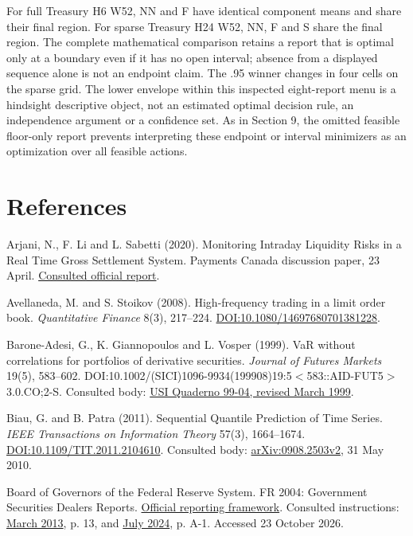 \documentclass[10pt,a4paper]{article}
\begin{document}
For full Treasury H6 W52, NN and F have identical component means and share their final region. For sparse Treasury H24 W52, NN, F and S share the final region. The complete mathematical comparison retains a report that is optimal only at a boundary even if it has no open interval; absence from a displayed sequence alone is not an endpoint claim. The .95 winner changes in four cells on the sparse grid. The lower envelope within this inspected eight-report menu is a hindsight descriptive object, not an estimated optimal decision rule, an independence argument or a confidence set. As in Section 9, the omitted feasible floor-only report prevents interpreting these endpoint or interval minimizers as an optimization over all feasible actions.

\section*{References}
Arjani, N., F. Li and L. Sabetti (2020). Monitoring Intraday Liquidity Risks in a Real Time Gross Settlement System. Payments Canada discussion paper, 23 April. \href{https://www.payments.ca/sites/default/files/discussion_paper_monitoring_intraday_liquidity_risks_in_a_real_time_gross_settlement_system.pdf}{Consulted official report}.

Avellaneda, M. and S. Stoikov (2008). High-frequency trading in a limit order book. \emph{Quantitative Finance} 8(3), 217–224. \href{https://doi.org/10.1080/14697680701381228}{DOI:10.1080/14697680701381228}.

Barone-Adesi, G., K. Giannopoulos and L. Vosper (1999). VaR without correlations for portfolios of derivative securities. \emph{Journal of Futures Markets} 19(5), 583–602. DOI:10.1002/(SICI)1096-9934(199908)19:5\( < \)583::AID-FUT5\( > \)3.0.CO;2-S. Consulted body: \href{https://folia.unifr.ch/documents/318043/files/wp9904.pdf}{USI Quaderno 99-04, revised March 1999}.

Biau, G. and B. Patra (2011). Sequential Quantile Prediction of Time Series. \emph{IEEE Transactions on Information Theory} 57(3), 1664–1674. \href{https://doi.org/10.1109/TIT.2011.2104610}{DOI:10.1109/TIT.2011.2104610}. Consulted body: \href{https://arxiv.org/abs/0908.2503v2}{arXiv:0908.2503v2}, 31 May 2010.

Board of Governors of the Federal Reserve System. FR 2004: Government Securities Dealers Reports. \href{https://www.federalreserve.gov/apps/reportingforms/Report/Index/FR_2004}{Official reporting framework}. Consulted instructions: \href{https://www.federalreserve.gov/apps/reportingforms/Download/DownloadAttachment?guid=f555fe11-e149-479b-8088-4ed4e9ae1206}{March 2013}, p. 13, and \href{https://www.federalreserve.gov/apps/reportingforms/Download/DownloadAttachment?guid=950ab256-b485-4586-99b0-b27eb205fdfa}{July 2024}, p. A-1. Accessed 23 October 2026.
\end{document}
